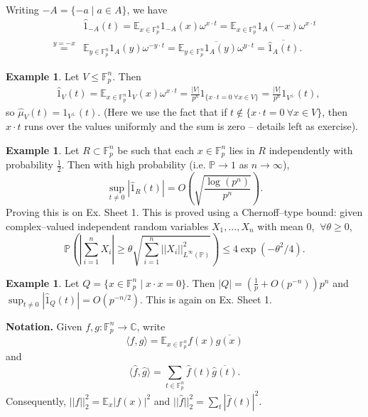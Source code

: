 \documentclass{article}
\theoremstyle{definition}
\newtheorem{example}[theorem]{Example}
\begin{document}
Writing $-A = \{-a \mid a \in A\}$, we have 
\begin{align*}
    &\hat{1}_{-A}(t) = \mathbb{E}_{x \in \mathbb{F}_{p}^n} 1_{-A}(x) \omega^{x\cdot t} = \mathbb{E}_{x \in \mathbb{F}_{p}^n} 1_A(-x)\omega^{x \cdot t} \\
    \stackrel{y=-x}{=}&  \mathbb{E}_{y \in \mathbb{F}_{p}^n} 1_A(y) \omega^{-y \cdot t} = \overline{\mathbb{E}_{y \in \mathbb{F}_{p}^n}1_A(y)\omega^{y \cdot t}} = \overline{\hat{1}_A(t)}.
\end{align*}
\begin{example}\label{ex1.2}
    Let $V \le \mathbb{F}_{p}^n$. Then 
    \begin{align*}
        &\hat{1}_V(t) = \mathbb{E}_{x \in \mathbb{F}_{p}^n}1_V(x)\omega^{x\cdot t} = \frac{|V|}{p^n} 1_{\{x\cdot t = 0 ~\forall x \in V\}} = \frac{|V|}{p^n}1_{V^{\perp}}(t),
    \end{align*}
    so $\hat{\mu}_V(t) = 1_{V^{\perp}}(t)$.
    (Here we use the fact that if $t \not\in \{x \cdot t = 0 ~\forall x \in V\}$, then $x\cdot t$ runs over the values uniformly and the sum is zero -- details left as exercise).
\end{example}
\begin{example}\label{ex1.3}
    Let $R \subset \mathbb{F}_{p}^n$ be such that each $x \in \mathbb{F}_{p}^n$ lies in $R$ independently with probability $\frac{1}{2}$. Then with high probability (i.e. $\mathbb{P} \to 1$ as $n \to \infty$),
    \[
    \sup_{t \neq 0} |\hat{1}_R(t)| = O\left(\sqrt{\frac{\log (p^n)}{p^n}}\right).
    \]
    Proving this is on Ex. Sheet 1. This is proved using a Chernoff--type bound: given complex--valued independent random variables $X_1,\ldots,X_n$ with mean 0, $~\forall \theta \ge 0$, 
    \[
    \mathbb{P}\left(\left|\sum_{i=1}^{n} X_i\right| \ge \theta \sqrt{\sum_{i=1}^{n} ||X_i||^2_{L^\infty(\mathbb{P})}}\right) \le 4\exp \left(-\theta^2/4\right).
    \]
\end{example}
\begin{example}
    Let $Q = \{x \in \mathbb{F}_{p}^n \mid x \cdot x = 0\}$. Then $|Q| = \left(\frac{1}{p} + O(p^{-n}) \right)p^n$ and $\sup_{t \neq 0}|\hat{1}_Q(t)| = O(p^{-n/2})$. This is again on Ex. Sheet 1.
\end{example}
\textbf{Notation.} Given $f,g : \mathbb{F}_{p}^n \to \mathbb{C}$, write \[
\langle f,g \rangle = \mathbb{E}_{x \in \mathbb{F}_{p}^n}f(x)\overline{g(x)}
\]
and \[
\langle \hat{f},\hat{g}\rangle = \sum_{t \in \mathbb{F}_{p}^n}^{} \hat{f}(t)\overline{\hat{g}(t)}.
\]
Consequently, $||f||_2^2 = \mathbb{E}_x |f(x)|^2$ and $||\hat{f}||_2^2 = \sum_{t}^{} |\hat{f}(t)|^2$.
\end{document}

